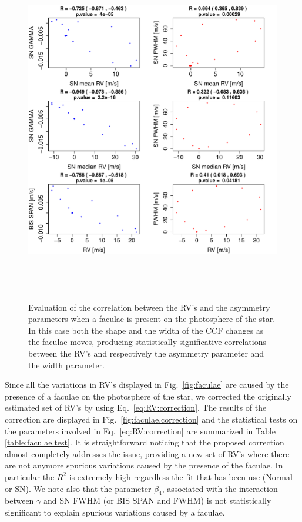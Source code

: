 \documentclass[11pt, oneside]{article}
\begin{document}
\begin{figure}[htbp]
   \centering
\includegraphics[height = 6in]{SOAP_FACULAE_Comparison_para_SN.pdf} 
   \caption{Evaluation of the correlation between the RV's and the asymmetry parameters when a faculae is present on the photosphere of the star. In this case both the shape and the width of the CCF changes as the faculae moves, producing statistically significative correlations between the RV's and respectively the asymmetry parameter and the width parameter.}
    \label{fig:faculae.corr}
\end{figure}

Since all the variations in RV's displayed in Fig.~\ref{fig:faculae} are caused by the presence of a faculae on the photosphere of the star, we corrected the originally estimated set of RV's by using Eq.~\ref{eq:RV:correction}. The results of the correction are displayed in Fig.~\ref{fig:faculae.correction} and the statistical tests on the parameters involved in Eq.~\ref{eq:RV:correction} are summarized in Table \ref{table:faculae.test}. It is straightforward noticing that the proposed correction almost completely addresses the issue, providing a new set of RV's where there are not anymore spurious variations caused by the presence of the faculae. In particular the $R^{2}$ is extremely high regardless the fit that has been use (Normal or SN). We note also that the parameter $\beta_{4}$, associated with the interaction between $\gamma$ and SN FWHM (or BIS SPAN and FWHM) is not statistically significant to explain spurious variations caused by a faculae.
\end{document}
